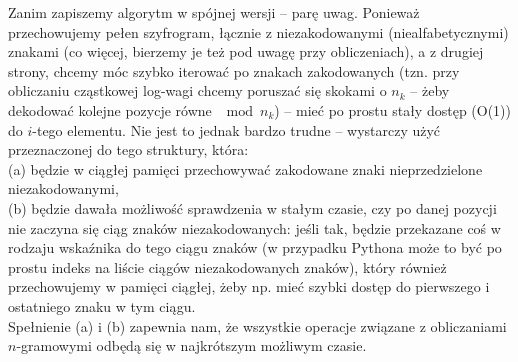 \documentclass[a4paper]{article}
\theoremstyle{defn}
\theoremstyle{theorem}
\theoremstyle{lemma}
\theoremstyle{cor}
\theoremstyle{fact}
\begin{document}
Zanim zapiszemy algorytm w spójnej wersji – parę uwag. Ponieważ przechowujemy pełen szyfrogram, łącznie z niezakodowanymi (niealfabetycznymi) znakami (co więcej, bierzemy je też pod uwagę przy obliczeniach), a z drugiej strony, chcemy móc szybko iterować po znakach zakodowanych (tzn. przy obliczaniu cząstkowej log-wagi chcemy poruszać się skokami o $n_k$ – żeby dekodować kolejne pozycje równe $\mod n_k$) – mieć po prostu stały dostęp (O(1)) do $i$-tego elementu. Nie jest to jednak bardzo trudne – wystarczy użyć przeznaczonej do tego struktury, która:\\
(a) będzie w ciągłej pamięci przechowywać zakodowane znaki nieprzedzielone niezakodowanymi,\\
(b) będzie dawała możliwość sprawdzenia w stałym czasie, czy po danej pozycji nie zaczyna się ciąg znaków niezakodowanych: jeśli tak, będzie przekazane coś w rodzaju wskaźnika do tego ciągu znaków (w przypadku Pythona może to być po prostu indeks na liście ciągów niezakodowanych znaków), który również przechowujemy w pamięci ciągłej, żeby np. mieć szybki dostęp do pierwszego i ostatniego znaku w tym ciągu.\\

Spełnienie (a) i (b) zapewnia nam, że wszystkie operacje związane z obliczaniami $n$-gramowymi odbędą się w najkrótszym możliwym czasie.\\
\end{document}
